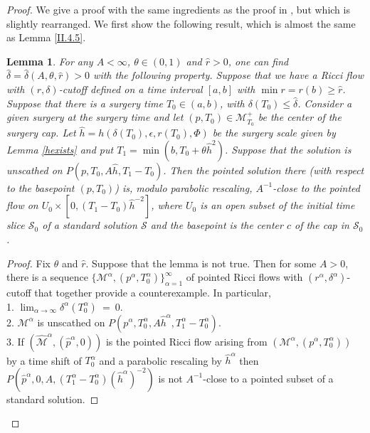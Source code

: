 \documentclass[12pt]{amsart}
\newcommand{\al}{\alpha}
\newcommand{\M}{{\mathcal M}}
\newcommand{\s}{{\mathcal S}}
\renewcommand{\th}{\theta}
\newcommand{\de}{\delta}
\newcommand{\eps}{\epsilon}
\numberwithin{equation}{section}
\theoremstyle{plain}
\newtheorem{lemma}[equation]{Lemma}
\theoremstyle{definition}
\theoremstyle{remark}
\begin{document}
\begin{proof}
We give a proof with the same ingredients as the proof in 
\cite{Perelman2}, but which
is slightly rearranged.  
We first show the following result, which is almost the same as
Lemma \ref{II.4.5}.
\begin{lemma} \label{intermediate}
For any $A<\infty$, $\th\in (0,1)$ and $\hat r>0$, 
one can find $\hat\de=\hat\de(A,\th,\hat r)>0$
with the following property.  Suppose that we
have a Ricci flow with $(r, \de)$-cutoff
defined on a time interval $[a,b]$ with  $\min r=r(b)\geq \hat r$. 
Suppose that there is a surgery time 
$T_0\in (a,b)$, with $\de(T_0)\leq \hat\de$.  Consider a given
surgery at the surgery time and let
$(p,T_0)\in\M_{T_0}^+$
be the center of the surgery cap.
Let $\hat h= h(\de(T_0),\eps,r(T_0),\Phi)$ be the surgery 
scale given by Lemma \ref{hexists} and put 
$T_1=\min(b,T_0+\th \hat h^2)$.
Suppose that the solution is unscathed on $P(p,T_0,A\hat h,T_1-T_0)$.
Then the pointed solution there (with respect to the basepoint
$(p, T_0)$) is, modulo parabolic
rescaling, $A^{-1}$-close to the pointed flow on
$U_0\times [0,(T_1-T_0)\hat h^{-2}]$, where
$U_0$ is an open subset of the initial time slice $\s_0$ 
of a standard solution
$\s$ and the basepoint is
the center $c$ of the cap in $\s_0$.
\end{lemma}
\begin{proof}
Fix $\theta$ and $\hat{r}$.
Suppose that the lemma is not true. Then for some $A > 0$,
there is a sequence $\{\M^\al, (p^\al,T_0^\al) \}_{\al = 1}^\infty$ of 
pointed Ricci flows with $(r^\al, \delta^\al)$-cutoff
that together provide a 
counterexample. In particular,\\
1. $\lim_{\al \rightarrow \infty} 
\delta^\al (T_0^\al) \: = \: 0$. \\
2. $\M^\al$ is unscathed on
$P(p^\al, T_0^\al, A {\hat h}^\al, T_1^\al - T_0^\al)$.\\
3. If
$(\widehat{\M}^\al, (\hat{p}^\al,0))$ is the pointed Ricci
flow arising from $(\M^\al, (p^\al,T_0^\al))$ by
a time shift of $T_0^\al$ and a 
parabolic rescaling by ${\hat h}^\al$ then
$P(\hat{p}^\al, 0, A, (T_1^\al - T_0^\al)(\hat{h}^\al)^{-2})$
is not $A^{-1}$-close to a pointed
subset of a standard solution.


\end{proof}
\end{proof}
\end{document}

